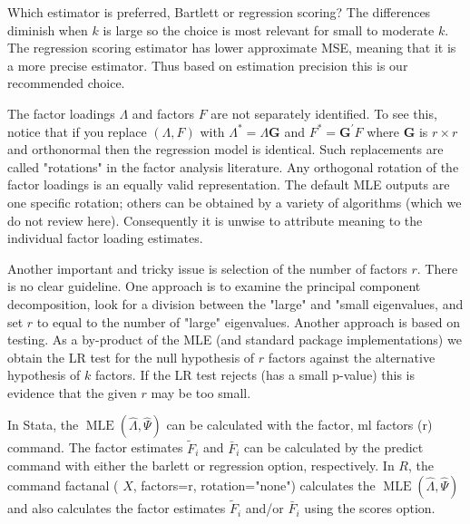\documentclass[10pt]{article}
\begin{document}
Which estimator is preferred, Bartlett or regression scoring? The differences diminish when $k$ is large so the choice is most relevant for small to moderate $k$. The regression scoring estimator has lower approximate MSE, meaning that it is a more precise estimator. Thus based on estimation precision this is our recommended choice.

The factor loadings $\Lambda$ and factors $F$ are not separately identified. To see this, notice that if you replace $(\Lambda, F)$ with $\Lambda^{*}=\Lambda \boldsymbol{G}$ and $F^{*}=\boldsymbol{G}^{\prime} F$ where $\boldsymbol{G}$ is $r \times r$ and orthonormal then the regression model is identical. Such replacements are called "rotations" in the factor analysis literature. Any orthogonal rotation of the factor loadings is an equally valid representation. The default MLE outputs are one specific rotation; others can be obtained by a variety of algorithms (which we do not review here). Consequently it is unwise to attribute meaning to the individual factor loading estimates.

Another important and tricky issue is selection of the number of factors $r$. There is no clear guideline. One approach is to examine the principal component decomposition, look for a division between the "large" and "small eigenvalues, and set $r$ to equal to the number of "large" eigenvalues. Another approach is based on testing. As a by-product of the MLE (and standard package implementations) we obtain the LR test for the null hypothesis of $r$ factors against the alternative hypothesis of $k$ factors. If the LR test rejects (has a small p-value) this is evidence that the given $r$ may be too small.

In Stata, the $\operatorname{MLE}(\widehat{\Lambda}, \widehat{\Psi})$ can be calculated with the factor, ml factors (r) command. The factor estimates $\widetilde{F}_{i}$ and $\bar{F}_{i}$ can be calculated by the predict command with either the barlett or regression option, respectively. In $R$, the command factanal ( $X$, factors=r, rotation="none") calculates the $\operatorname{MLE}(\widehat{\Lambda}, \widehat{\Psi})$ and also calculates the factor estimates $\widetilde{F}_{i}$ and/or $\bar{F}_{i}$ using the scores option.
\end{document}
